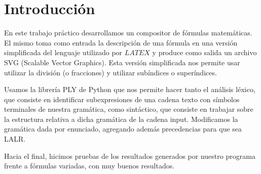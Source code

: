 \section{Introducción}
En este trabajo práctico desarrollamos un compositor de fórmulas
matemáticas. El mismo toma como entrada la descripción de una fórmula
en una versión simplificada del lenguaje utilizado por $LATEX$ y produce como salida un archivo SVG (Scalable Vector Graphics).
Esta versión simplificada nos permite usar utilizar la división (o fracciones) y utilizar subíndices o superíndices.

Usamos la librería PLY \cite{ply} de Python que nos permite hacer tanto el análisis léxico, que consiste en identificar subexpresiones de una cadena texto con símbolos terminales de nuestra gramática, como sintáctico, que consiste en trabajar sobre la estructura relativa a dicha gramática de la cadena input. Modificamos la gramática dada por enunciado, agregando además precedencias para que sea LALR.

Hacia el final, hicimos pruebas de los resultados generados por nuestro programa frente a fórmulas variadas, con muy buenos resultados.
